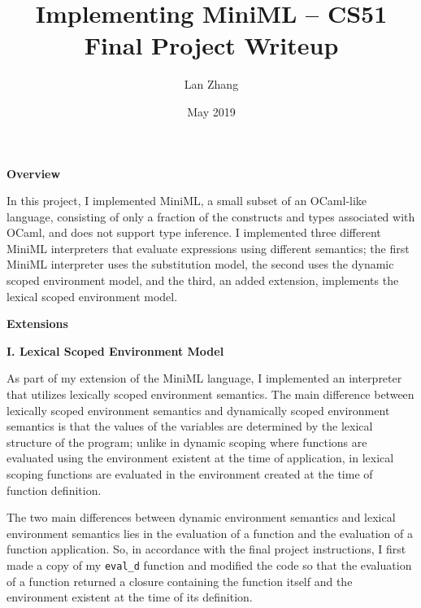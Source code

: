 \documentclass[12pt]{extarticle}
\title{\textbf{Implementing MiniML -- CS51 Final Project Writeup}}
\author{Lan Zhang}
\date{May 2019}
\begin{document}
\maketitle
\begin{center}
    \Large
    \textbf{Overview}
\end{center}
\vspace{0.3cm}

In this project, I implemented MiniML, a small subset of an OCaml-like language, consisting of only a fraction of the constructs and types associated with OCaml, and does not support type inference. I implemented three different MiniML interpreters that evaluate expressions using different semantics; the first MiniML interpreter uses the substitution model, the second uses the dynamic scoped environment model, and the third, an added extension, implements the lexical scoped environment model.

\vspace{0.3cm}
\begin{center}
    \Large
    \textbf{Extensions}
\end{center}
\vspace{0.3cm}

\large \textbf{I. Lexical Scoped Environment Model}
\vspace{0.3cm}

\normalsize

As part of my extension of the MiniML language, I implemented an interpreter that utilizes lexically scoped environment semantics. The main difference between  lexically scoped environment semantics and dynamically scoped environment semantics is that the values of the variables are determined by the lexical structure of the program; unlike in dynamic scoping where functions are evaluated using the environment existent at the time of application, in lexical scoping functions are evaluated in the environment created at the time of function definition.

\vspace{0.3cm}
The two main differences between dynamic environment semantics and lexical environment semantics lies in the evaluation of a function and the evaluation of a function application. So, in accordance with the final project instructions, I first made a copy of my \texttt{eval_d} function and modified the code so that the evaluation of a function returned a closure containing the function itself and the environment existent at the time of its definition. 
\end{document}
